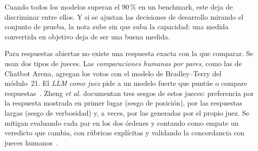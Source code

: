 \begin{observacion}
Cuando todos los modelos superan el 90\,\% en un benchmark, este deja de discriminar entre ellos. Y si se ajustan las decisiones de desarrollo mirando el conjunto de prueba, la nota sube sin que suba la capacidad: una medida convertida en objetivo deja de ser una buena medida.
\end{observacion}

Para respuestas abiertas no existe una respuesta exacta con la que comparar. Se usan dos tipos de jueces. Las \emph{comparaciones humanas por pares}, como las de Chatbot Arena, agregan los votos con el modelo de Bradley--Terry del módulo~21. El \emph{LLM como juez} pide a un modelo fuerte que puntúe o compare respuestas~\cite{zheng}. Zheng \emph{et al.} documentan tres sesgos de estos jueces: preferencia por la respuesta mostrada en primer lugar (sesgo de posición), por las respuestas largas (sesgo de verbosidad) y, a veces, por las generadas por el propio juez. Se mitigan evaluando cada par en los dos órdenes y contando como empate un veredicto que cambia, con rúbricas explícitas y validando la concordancia con jueces humanos~\cite{zheng}.

